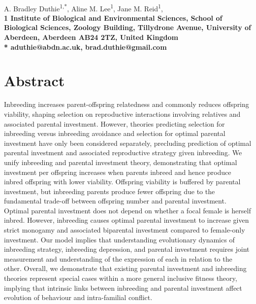 \documentclass[10pt,letterpaper]{article}
\begin{document}
\vspace*{0.35in}

\begin{flushleft}
{\LARGE
\textbf{}
}
\newline
\\
A. Bradley Duthie\textsuperscript{1,*},
Aline M. Lee\textsuperscript{1},
Jane M. Reid\textsuperscript{1},
\\
\bigskip
\bf{1} Institute of Biological and Environmental Sciences, School of Biological Sciences, Zoology Building, Tillydrone Avenue, University of Aberdeen, Aberdeen AB24 2TZ, United Kingdom
\\
\bigskip
*  aduthie@abdn.ac.uk, brad.duthie@gmail.com

\end{flushleft}

\section*{Abstract}
Inbreeding increases parent-offspring relatedness and commonly reduces offspring viability, shaping selection on reproductive interactions involving relatives and associated parental investment. However, theories predicting selection for inbreeding versus inbreeding avoidance and selection for optimal parental investment have only been considered separately, precluding prediction of optimal parental investment and associated reproductive strategy given inbreeding. We unify inbreeding and parental investment theory, demonstrating that optimal investment per offspring increases when parents inbreed and hence produce inbred offspring with lower viability. Offspring viability is buffered by parental investment, but inbreeding parents produce fewer offspring due to the fundamental trade-off between offspring number and parental investment. Optimal parental investment does not depend on whether a focal female is herself inbred. However, inbreeding causes optimal parental investment to increase given strict monogamy and associated biparental investment compared to female-only investment. Our model implies that understanding evolutionary dynamics of inbreeding strategy, inbreeding depression, and parental investment requires joint measurement and understanding of the expression of each in relation to the other. Overall, we demonstrate that existing parental investment and inbreeding theories represent special cases within a more general inclusive fitness theory, implying that intrinsic links between inbreeding and parental investment affect evolution of behaviour and intra-familial conflict.
\end{document}
